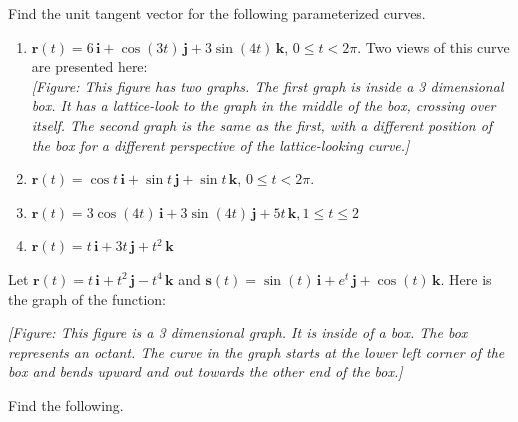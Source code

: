\documentclass{exercises}
\begin{document}
Find the unit tangent vector for the following parameterized curves.

\begin{enumerate}[resume]
\item $\mathbf{r}(t)=6\,\mathbf{i}+\cos(3t)\,\mathbf{j}+3\sin(4t)\,\mathbf{k}$, $0\le t<2\pi$. Two views of this curve are presented here: \\ \textit{[Figure: This figure has two graphs. The first graph is inside a 3 dimensional box. It has a lattice-look to the graph in the middle of the box, crossing over itself. The second graph is the same as the first, with a different position of the box for a different perspective of the lattice-looking curve.]}
\item $\mathbf{r}(t)=\cos t\,\mathbf{i}+\sin t\,\mathbf{j}+\sin t\,\mathbf{k}$, $0\le t<2\pi$.
\item $\mathbf{r}(t)=3\cos(4t)\,\mathbf{i}+3\sin(4t)\,\mathbf{j}+5t\,\mathbf{k},1\le t\le2$
\item $\mathbf{r}(t)=t\,\mathbf{i}+3t\,\mathbf{j}+t^{2}\,\mathbf{k}$
\end{enumerate}

Let $\mathbf{r}(t)=t\,\mathbf{i}+t^{2}\,\mathbf{j}-t^{4}\,\mathbf{k}$ and $\mathbf{s}(t)=\sin(t)\,\mathbf{i}+e^{t}\,\mathbf{j}+\cos(t)\,\mathbf{k}$. Here is the graph of the function:


\textit{[Figure: This figure is a 3 dimensional graph. It is inside of a box. The box represents an octant. The curve in the graph starts at the lower left corner of the box and bends upward and out towards the other end of the box.]}


Find the following.
\end{document}

